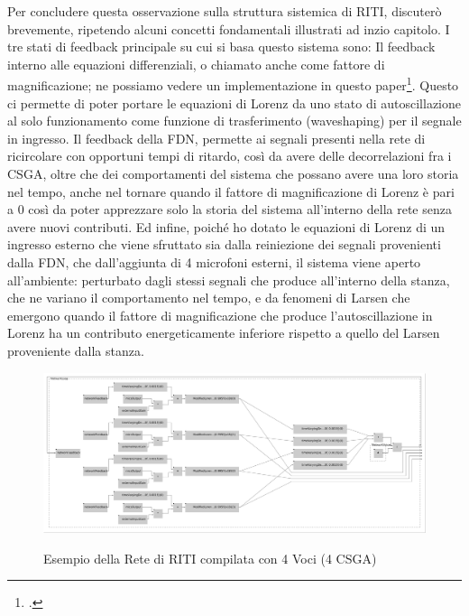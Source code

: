Per concludere questa osservazione sulla struttura sistemica di RITI,
discuterò brevemente, ripetendo alcuni concetti fondamentali illustrati ad inzio capitolo.
I tre stati di feedback principale su cui si basa questo sistema sono:
Il feedback interno alle equazioni differenziali, o chiamato anche come fattore di magnificazione; 
ne possiamo vedere un implementazione in questo paper\footcite{liang_difference_2013}.
Questo ci permette di poter portare le equazioni di Lorenz da uno stato di autoscillazione al
solo funzionamento come funzione di trasferimento (waveshaping) per il segnale in ingresso.
Il feedback della FDN, permette ai segnali presenti nella rete di ricircolare
con opportuni tempi di ritardo, così da avere delle decorrelazioni fra i CSGA, oltre che dei comportamenti del sistema
che possano avere una loro storia nel tempo, anche nel tornare quando il fattore di magnificazione di Lorenz è pari a 0
così da poter apprezzare solo la storia del sistema all'interno della rete senza avere nuovi contributi.
Ed infine, poiché ho dotato le equazioni di Lorenz di un ingresso esterno che viene sfruttato
sia dalla reiniezione dei segnali provenienti dalla FDN, che dall'aggiunta di 4 microfoni esterni,
il sistema viene aperto all'ambiente: perturbato dagli stessi segnali che produce all'interno della stanza,
che ne variano il comportamento nel tempo, e da fenomeni di Larsen che emergono quando il fattore di 
magnificazione che produce l'autoscillazione in Lorenz ha un contributo energeticamente 
inferiore rispetto a quello del Larsen proveniente dalla stanza.
\clearpage

\begin{figure}[h!]
\begin{center}
    \includegraphics[width=15cm]{figures/RITI4VoiceNetwork.pdf} \\
    \caption {Esempio della Rete di RITI compilata con 4 Voci (4 CSGA)}
\end{center}
\end{figure}

